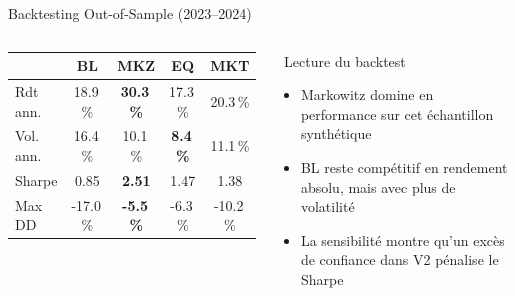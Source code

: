 \documentclass[aspectratio=169, 10pt, t]{beamer}
\begin{document}
\begin{frame}{Backtesting Out-of-Sample (2023--2024)}
\begin{columns}[c]
\begin{tabular}{@{}lcccc@{}}
        & \textbf{BL} & \textbf{MKZ} & \textbf{EQ} & \textbf{MKT} \\
        \midrule
        Rdt ann. & 18.9\,\% & \textbf{30.3\,\%} & 17.3\,\% & 20.3\,\% \\
        Vol. ann. & 16.4\,\% & 10.1\,\% & \textbf{8.4\,\%} & 11.1\,\% \\
        Sharpe & 0.85 & \textbf{2.51} & 1.47 & 1.38 \\
        Max DD & -17.0\,\% & \textbf{-5.5\,\%} & -6.3\,\% & -10.2\,\% \\
        \bottomrule
      \end{tabular}
      \vspace{0.5em}
      \begin{exampleblock}{\small\faTrophy\ Lecture du backtest}
        \small
        \begin{itemize}
          \setlength{\itemsep}{3pt}
          \item Markowitz domine en performance sur cet échantillon synthétique
          \item BL reste compétitif en rendement absolu, mais avec plus de volatilité
          \item La sensibilité montre qu'un excès de confiance dans V2 pénalise le Sharpe
        \end{itemize}
      \end{exampleblock}
  \end{columns}
\end{frame}
\end{document}
